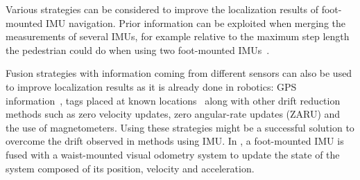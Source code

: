 Various strategies can be considered to improve the localization results of foot-mounted IMU navigation.
Prior information can be exploited when merging the measurements of several IMUs, for example relative to the maximum step length the pedestrian could do when using two foot-mounted IMUs~\cite{skog2012fusing}.

Fusion strategies with information coming from different sensors can also be used to improve localization results as it is already done
 in robotics: GPS information~\cite{sukkarieh1999high,hide2012investigating,gao2014data},%
 tags placed at known locations~\cite{ruiz2012accurate} along with other drift reduction methods such as zero velocity updates, zero angular-rate updates (ZARU) and the use of magnetometers.
Using these strategies might be a successful solution to overcome the drift observed in methods using IMU.%
In \cite{chdid2011inertial}, a foot-mounted IMU is fused with a waist-mounted visual odometry system to update the state of the system composed of its position, velocity and acceleration.

